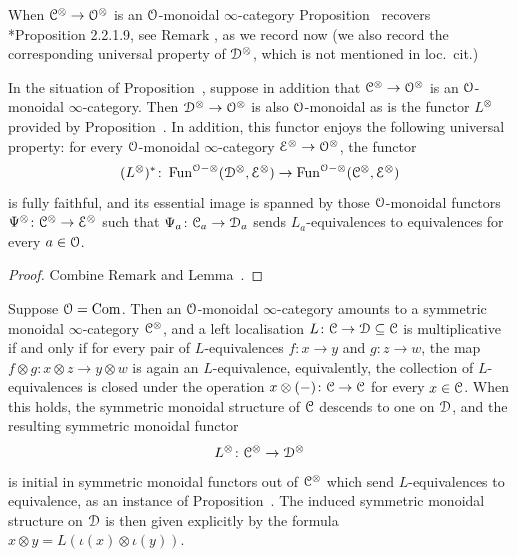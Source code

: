 When $\mathcal C^{\otimes} \to \mathcal{O}^{\otimes}$ is an $\mathcal{O}$-monoidal $\infty$-category Proposition~ recovers \cite{HA}*{Proposition 2.2.1.9}, see Remark , as we record now (we also record the corresponding universal property of $\mathcal{D}^{\otimes}$, which is not mentioned in loc.\ cit.)

\begin{proposition}
\label{proposition:multiplicative-localisation-2}%
In the situation of Proposition~, suppose in addition that $\mathcal C^{\otimes} \to \mathcal{O}^{\otimes}$ is an $\mathcal{O}$-monoidal $\infty$-category. Then $\mathcal{D}^{\otimes} \to \mathcal{O}^{\otimes}$ is also $\mathcal{O}$-monoidal as is the functor $L^{\otimes}$ provided by Proposition~. In addition, this functor
enjoys the following universal property: for every $\mathcal{O}$-monoidal $\infty$-category $\mathcal{E}^{\otimes} \to \mathcal{O}^{\otimes}$, the functor
\[
(L^{\otimes})^*\colon \operatorname{Fun}^{\mathcal{O}-\otimes}(\mathcal{D}^{\otimes},\mathcal{E}^{\otimes}) \to \operatorname{Fun}^{\mathcal{O}-\otimes}(\mathcal C^{\otimes},\mathcal{E}^{\otimes})
\]
is fully faithful, and its essential image is spanned by those $\mathcal{O}$-monoidal functors $\Psi^{\otimes}\colon \mathcal C^{\otimes} \to \mathcal{E}^{\otimes}$ such that $\Psi_a\colon \mathcal C_a \to \mathcal{D}_a$ sends $L_a$-equivalences to equivalences for every $a \in \mathcal{O}$.
\end{proposition}
\begin{proof}
Combine Remark  and Lemma~.
\end{proof}


\begin{example}
\label{example:sm-localisation}%
Suppose $\mathcal{O} = \mathrm{Com}$. Then an $\mathcal{O}$-monoidal $\infty$-category amounts to a symmetric monoidal $\infty$-category $\mathcal C^{\otimes}$, and a left localisation $L\colon \mathcal C \to \mathcal{D} \subseteq \mathcal C$ is multiplicative if and only if for every pair of $L$-equivalences $f\colon x \to y$ and $g\colon z \to w$, the map $f \otimes g \colon x \otimes z \to y \otimes w$ is again an $L$-equivalence, equivalently, the collection of $L$-equivalences is closed under the operation $x \otimes (-)\colon \mathcal C \to \mathcal C$ for every $x \in \mathcal C$. 
When this holds, the symmetric monoidal structure of $\mathcal C$ descends to one on $\mathcal{D}$, and the resulting symmetric monoidal functor
\[
L^{\otimes} \colon \mathcal C^{\otimes} \to \mathcal{D}^{\otimes}
\]
is initial in symmetric monoidal functors out of $\mathcal C^{\otimes}$  which send $L$-equivalences to equivalence, as an instance of Proposition~.
The induced symmetric monoidal structure on $\mathcal{D}$ is then given explicitly by the formula $x \otimes y = L(\iota(x) \otimes \iota(y))$.
\end{example}

